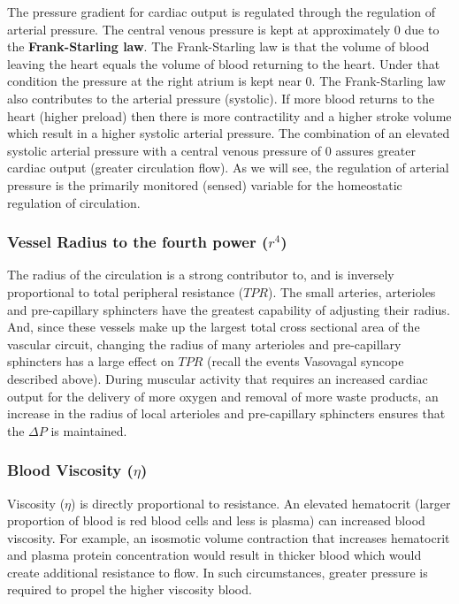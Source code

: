 The pressure gradient for cardiac output is regulated through the regulation of arterial pressure. The central venous pressure is kept at approximately 0 due to the \textbf{Frank-Starling law}. The Frank-Starling law is that the volume of blood leaving the heart equals the volume of blood returning to the heart. Under that condition the pressure at the right atrium is kept near 0. The Frank-Starling law also contributes to the arterial pressure (systolic). If more blood returns to the heart (higher preload) then there is more contractility and a higher stroke volume which result in a higher systolic arterial pressure. The combination of an elevated systolic arterial pressure with a central venous pressure of 0 assures greater cardiac output (greater circulation flow). As we will see, the regulation of arterial pressure is the primarily monitored (sensed) variable for the homeostatic regulation of circulation. 

\subsubsection{Vessel Radius to the fourth power ($r^4$)}

The radius of the circulation is a strong contributor to, and is inversely proportional to total peripheral resistance ($TPR$). The small arteries, arterioles and pre-capillary sphincters have the greatest capability of adjusting their radius. And, since these vessels make up the largest total cross sectional area of the vascular circuit, changing the radius of many arterioles and pre-capillary sphincters has a large effect on $TPR$ (recall the events Vasovagal syncope described above). During muscular activity that requires an increased cardiac output for the delivery of more oxygen and removal of more waste products, an increase in the radius of local arterioles and pre-capillary sphincters ensures that the $\Delta P$ is maintained.

\subsubsection{Blood Viscosity ($\eta$)}

Viscosity ($\eta$) is directly proportional to resistance. An elevated hematocrit (larger proportion of blood is red blood cells and less is plasma) can increased blood viscosity. For example, an isosmotic volume contraction that increases hematocrit and plasma protein concentration would result in thicker blood which would create additional resistance to flow. In such circumstances, greater pressure is required to propel the higher viscosity blood.

